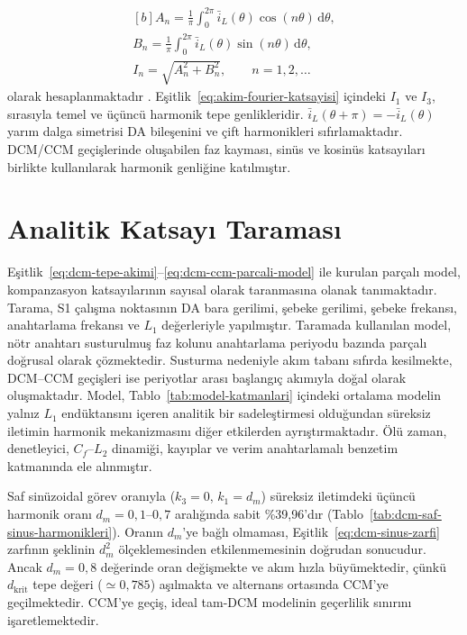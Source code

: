 \begin{equation}
  \begin{gathered}[b]
    A_n=\frac{1}{\pi}\int_0^{2\pi}\bar i_L(\theta)\cos(n\theta)\,\mathrm{d}\theta,\\
    B_n=\frac{1}{\pi}\int_0^{2\pi}\bar i_L(\theta)\sin(n\theta)\,\mathrm{d}\theta,\\
    I_n=\sqrt{A_n^2+B_n^2},\qquad n=1,2,\ldots
  \end{gathered}
  \label{eq:akim-fourier-katsayisi}
\end{equation}
olarak hesaplanmaktadır \citep{Oppenheim1997}. Eşitlik~\eqref{eq:akim-fourier-katsayisi} içindeki $I_1$ ve $I_3$, sırasıyla temel ve üçüncü harmonik tepe genlikleridir. $\bar i_L(\theta+\pi)=-\bar i_L(\theta)$ yarım dalga simetrisi DA bileşenini ve çift harmonikleri sıfırlamaktadır. DCM/CCM geçişlerinde oluşabilen faz kayması, sinüs ve kosinüs katsayıları birlikte kullanılarak harmonik genliğine katılmıştır.

\section{Analitik Katsayı Taraması}
\label{sec:sin3-yeniden-tarama}

Eşitlik~\eqref{eq:dcm-tepe-akimi}--\eqref{eq:dcm-ccm-parcali-model} ile kurulan parçalı model, kompanzasyon katsayılarının sayısal olarak taranmasına olanak tanımaktadır. Tarama, S1 çalışma noktasının DA bara gerilimi, şebeke gerilimi, şebeke frekansı, anahtarlama frekansı ve $L_1$ değerleriyle yapılmıştır. Taramada kullanılan model, nötr anahtarı susturulmuş faz kolunu anahtarlama periyodu bazında parçalı doğrusal olarak çözmektedir. Susturma nedeniyle akım tabanı sıfırda kesilmekte, DCM--CCM geçişleri ise periyotlar arası başlangıç akımıyla doğal olarak oluşmaktadır. Model, Tablo~\ref{tab:model-katmanlari} içindeki ortalama modelin yalnız $L_1$ endüktansını içeren analitik bir sadeleştirmesi olduğundan süreksiz iletimin harmonik mekanizmasını diğer etkilerden ayrıştırmaktadır. Ölü zaman, denetleyici, $C_f$--$L_2$ dinamiği, kayıplar ve verim anahtarlamalı benzetim katmanında ele alınmıştır.

Saf sinüzoidal görev oranıyla ($k_3=0$, $k_1=d_m$) süreksiz iletimdeki üçüncü harmonik oranı $d_m=0{,}1$--$0{,}7$ aralığında sabit \%39,96'dır (Tablo~\ref{tab:dcm-saf-sinus-harmonikleri}). Oranın $d_m$'ye bağlı olmaması, Eşitlik~\eqref{eq:dcm-sinus-zarfi} zarfının şeklinin $d_m^2$ ölçeklemesinden etkilenmemesinin doğrudan sonucudur. Ancak $d_m=0{,}8$ değerinde oran değişmekte ve akım hızla büyümektedir, çünkü $d_{\mathrm{krit}}$ tepe değeri ($\simeq0{,}785$) aşılmakta ve alternans ortasında CCM'ye geçilmektedir. CCM'ye geçiş, ideal tam-DCM modelinin geçerlilik sınırını işaretlemektedir.

